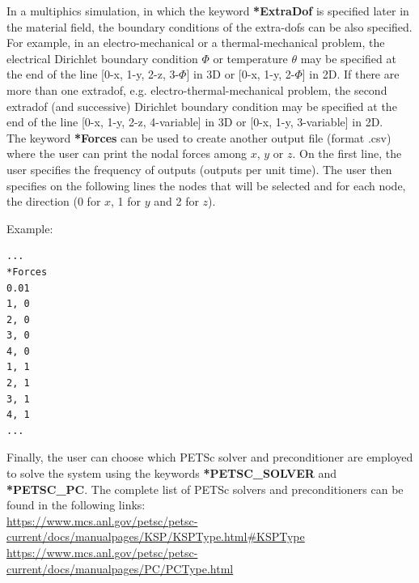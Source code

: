 \documentclass[oneside,11pt,times]{book}
\begin{document}
In a multiphics simulation, in which the keyword \textbf{*ExtraDof} is specified later in the material field, the boundary conditions of the extra-dofs can be also specified. For example, in an electro-mechanical or a thermal-mechanical problem, the electrical Dirichlet boundary condition $\Phi$ or temperature $\theta$ may be specified at the end of the line [0-x, 1-y, 2-z, 3-$\Phi$] in 3D or [0-x, 1-y, 2-$\Phi$] in 2D. If there are more than one extradof, e.g. electro-thermal-mechanical problem, the second extradof (and successive) Dirichlet boundary condition may be specified at the end of the line [0-x, 1-y, 2-z, 4-variable] in 3D or [0-x, 1-y, 3-variable] in 2D.\\



The keyword \textbf{*Forces} can be used to create another output file (format .csv) where the user can print the nodal forces among $x$, $y$ or $z$. On the first line, the user specifies the frequency of outputs (outputs per unit time). The user then specifies on the following lines the nodes that will be selected and for each node, the direction (0 for $x$, 1 for $y$ and 2 for $z$).

Example:
\begin{lstlisting}
...
*Forces
0.01
1, 0
2, 0
3, 0
4, 0
1, 1
2, 1
3, 1
4, 1
...\end{lstlisting}
Finally, the user can choose which
PETSc solver and preconditioner are employed to solve the system using the keywords \textbf{*PETSC\_SOLVER} and  \textbf{*PETSC\_PC}. The complete list of PETSc solvers and preconditioners can be found in the following links:\\
\url{https://www.mcs.anl.gov/petsc/petsc-current/docs/manualpages/KSP/KSPType.html#KSPType}\\
 \url{https://www.mcs.anl.gov/petsc/petsc-current/docs/manualpages/PC/PCType.html}\\
\end{document}
